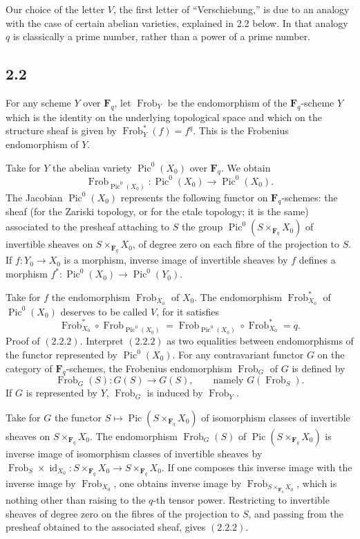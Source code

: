 \documentclass[11pt]{article}
\newcommand{\Fq}{\mathbf F_q}
\newcommand{\Frob}{\operatorname{Frob}}
\newcommand{\Pic}{\operatorname{Pic}}
\newcommand{\id}{\operatorname{id}}
\begin{document}
Our choice of the letter \(V\), the first letter of ``Verschiebung,'' is due to an analogy with the case of certain abelian varieties, explained in 2.2 below. In that analogy \(q\) is classically a prime number, rather than a power of a prime number.

\subsection{2.2}
For any scheme \(Y\) over \(\Fq\), let \(\Frob_Y\) be the endomorphism of the \(\Fq\)-scheme \(Y\) which is the identity on the underlying topological space and which on the structure sheaf is given by \(\Frob_Y^*(f)=f^q\). This is the Frobenius endomorphism of \(Y\).

Take for \(Y\) the abelian variety \(\Pic^0(X_0)\) over \(\Fq\). We obtain
\begin{equation}\tag{2.2.1}
\Frob_{\Pic^0(X_0)}:\Pic^0(X_0)\to\Pic^0(X_0).
\end{equation}
The Jacobian \(\Pic^0(X_0)\) represents the following functor on \(\Fq\)-schemes: the sheaf (for the Zariski topology, or for the etale topology; it is the same) associated to the presheaf attaching to \(S\) the group \(\Pic^0(S\times_{\Fq}X_0)\) of invertible sheaves on \(S\times_{\Fq}X_0\), of degree zero on each fibre of the projection to \(S\). If \(f:Y_0\to X_0\) is a morphism, inverse image of invertible sheaves by \(f\) defines a morphism \(f^*:\Pic^0(X_0)\to\Pic^0(Y_0)\).

Take for \(f\) the endomorphism \(\Frob_{X_0}\) of \(X_0\). The endomorphism \(\Frob_{X_0}^*\) of \(\Pic^0(X_0)\) deserves to be called \(V\), for it satisfies
\begin{equation}\tag{2.2.2}
\Frob_{X_0}^*\circ \Frob_{\Pic^0(X_0)}=\Frob_{\Pic^0(X_0)}\circ \Frob_{X_0}^*=q.
\end{equation}
Proof of \((2.2.2)\). Interpret \((2.2.2)\) as two equalities between endomorphisms of the functor represented by \(\Pic^0(X_0)\). For any contravariant functor \(G\) on the category of \(\Fq\)-schemes, the Frobenius endomorphism \(\Frob_G\) of \(G\) is defined by
\[
\Frob_G(S):G(S)\to G(S),\qquad \text{namely }G(\Frob_S).
\]
If \(G\) is represented by \(Y\), \(\Frob_G\) is induced by \(\Frob_Y\).

Take for \(G\) the functor \(S\mapsto\Pic(S\times_{\Fq}X_0)\) of isomorphism classes of invertible sheaves on \(S\times_{\Fq}X_0\). The endomorphism \(\Frob_G(S)\) of \(\Pic(S\times_{\Fq}X_0)\) is inverse image of isomorphism classes of invertible sheaves by \(\Frob_S\times\id_{X_0}:S\times_{\Fq}X_0\to S\times_{\Fq}X_0\). If one composes this inverse image with the inverse image by \(\Frob_{X_0}\), one obtains inverse image by \(\Frob_{S\times_{\Fq}X_0}\), which is nothing other than raising to the \(q\)-th tensor power. Restricting to invertible sheaves of degree zero on the fibres of the projection to \(S\), and passing from the presheaf obtained to the associated sheaf, gives \((2.2.2)\).
\end{document}
